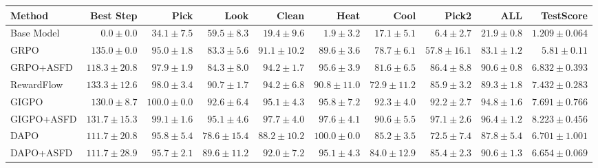 \begin{tabular}{lrrrrrrrrr}
\toprule
Method & Best Step & Pick & Look & Clean & Heat & Cool & Pick2 & ALL & TestScore \\
\midrule
Base Model & $0.0 \pm 0.0$ & $34.1 \pm 7.5$ & $59.5 \pm 8.3$ & $19.4 \pm 9.6$ & $1.9 \pm 3.2$ & $17.1 \pm 5.1$ & $6.4 \pm 2.7$ & $21.9 \pm 0.8$ & $1.209 \pm 0.064$ \\
GRPO & $135.0 \pm 0.0$ & $95.0 \pm 1.8$ & $83.3 \pm 5.6$ & $91.1 \pm 10.2$ & $89.6 \pm 3.6$ & $78.7 \pm 6.1$ & $57.8 \pm 16.1$ & $83.1 \pm 1.2$ & $5.81 \pm 0.11$ \\
GRPO+ASFD & $118.3 \pm 20.8$ & $97.9 \pm 1.9$ & $84.3 \pm 8.0$ & $94.2 \pm 1.7$ & $95.6 \pm 3.9$ & $81.6 \pm 6.5$ & $86.4 \pm 8.8$ & $90.6 \pm 0.8$ & $6.832 \pm 0.393$ \\
RewardFlow & $133.3 \pm 12.6$ & $98.0 \pm 3.4$ & $90.7 \pm 1.7$ & $94.2 \pm 6.8$ & $90.8 \pm 11.0$ & $72.9 \pm 11.2$ & $85.9 \pm 3.2$ & $89.3 \pm 1.8$ & $7.432 \pm 0.283$ \\
GIGPO & $130.0 \pm 8.7$ & $100.0 \pm 0.0$ & $92.6 \pm 6.4$ & $95.1 \pm 4.3$ & $95.8 \pm 7.2$ & $92.3 \pm 4.0$ & $92.2 \pm 2.7$ & $94.8 \pm 1.6$ & $7.691 \pm 0.766$ \\
GIGPO+ASFD & $131.7 \pm 15.3$ & $99.1 \pm 1.6$ & $95.1 \pm 4.6$ & $97.7 \pm 4.0$ & $97.6 \pm 4.1$ & $90.6 \pm 5.5$ & $97.1 \pm 2.6$ & $96.4 \pm 1.2$ & $8.223 \pm 0.456$ \\
DAPO & $111.7 \pm 20.8$ & $95.8 \pm 5.4$ & $78.6 \pm 15.4$ & $88.2 \pm 10.2$ & $100.0 \pm 0.0$ & $85.2 \pm 3.5$ & $72.5 \pm 7.4$ & $87.8 \pm 5.4$ & $6.701 \pm 1.001$ \\
DAPO+ASFD & $111.7 \pm 28.9$ & $95.7 \pm 2.1$ & $89.6 \pm 11.2$ & $92.0 \pm 7.2$ & $95.1 \pm 4.3$ & $84.0 \pm 12.9$ & $85.4 \pm 2.3$ & $90.6 \pm 1.3$ & $6.654 \pm 0.069$ \\
\bottomrule
\end{tabular}
